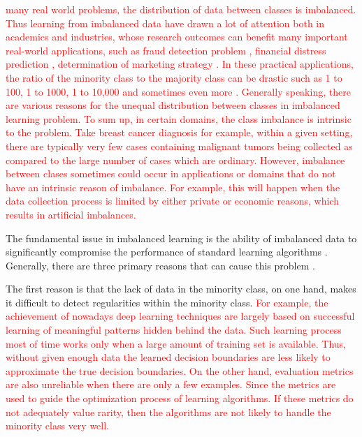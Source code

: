 \documentclass[10pt,journal,compsoc]{IEEEtran}
\begin{document}
% 
% 
% 
% 
\textcolor{red}{ many real world problems, the distribution of data between classes is imbalanced. Thus learning from imbalanced data \cite{chawla2004editorial}\cite{japkowicz2000learning}\cite{he2013imbalanced}\cite{provost2000machine}\cite{japkowicz2002class} have drawn a lot of attention both in academics and industries, whose research outcomes can benefit many important real-world applications, such as fraud detection problem \cite{provost2001robust}, financial distress prediction \cite{chen2009cost}, determination of marketing strategy \cite{ling1998data}. In these practical applications, the ratio of the minority class to the majority class can be drastic such as 1 to 100, 1 to 1000, 1 to 10,000 and sometimes even more \cite{Wu03class-boundaryalignment}. Generally speaking, there are various reasons for the unequal distribution between classes in imbalanced learning problem. To sum up, in certain domains, the class imbalance is intrinsic to the problem. Take breast cancer diagnosis \cite{parvin2013new} for example, within a given setting, there are typically very few cases containing malignant tumors being collected as compared to the large number of cases which are ordinary. However, imbalance between clases sometimes could occur in applications or domains that do not have an intrinsic reason of imbalance. For example, this will happen when the data collection process is limited by either private or economic reasons, which results in artificial imbalances. }

The fundamental issue in imbalanced learning is the ability of imbalanced data to significantly compromise the performance of standard learning algorithms \cite{HH:09}. Generally, there are three primary reasons that can cause this problem \cite{weiss2004mining}. 

The first reason is that the lack of data in the minority class, on one hand, makes it difficult to detect regularities within the minority class. \textcolor{red}{For example, the achievement of nowadays deep learning techniques are largely based on successful learning of meaningful patterns hidden behind the data. Such learning process most of time works only when a large amount of training set is available. Thus, without given enough data the learned decision boundaries are less likely to approximate the true decision boundaries. On the other hand, evaluation metrics are also unreliable when there are only a few examples. Since the metrics are used to guide the optimization process of learning algorithms. If these metrics do not adequately value rarity, then the algorithms are not likely to handle the minority class very well.}
\end{document}
